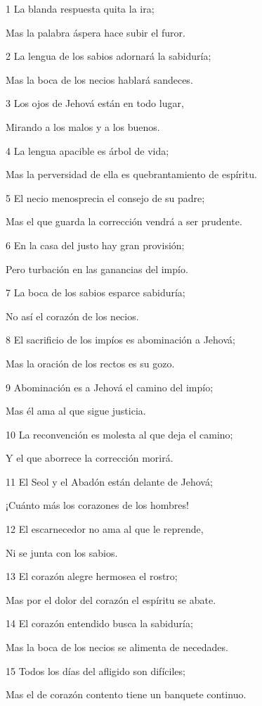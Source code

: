 \par 1 La blanda respuesta quita la ira;
\par Mas la palabra áspera hace subir el furor.
\par 2 La lengua de los sabios adornará la sabiduría;
\par Mas la boca de los necios hablará sandeces.
\par 3 Los ojos de Jehová están en todo lugar,
\par Mirando a los malos y a los buenos.
\par 4 La lengua apacible es árbol de vida;
\par Mas la perversidad de ella es quebrantamiento de espíritu.
\par 5 El necio menosprecia el consejo de su padre;
\par Mas el que guarda la corrección vendrá a ser prudente.
\par 6 En la casa del justo hay gran provisión;
\par Pero turbación en las ganancias del impío.
\par 7 La boca de los sabios esparce sabiduría;
\par No así el corazón de los necios.
\par 8 El sacrificio de los impíos es abominación a Jehová;
\par Mas la oración de los rectos es su gozo.
\par 9 Abominación es a Jehová el camino del impío;
\par Mas él ama al que sigue justicia.
\par 10 La reconvención es molesta al que deja el camino;
\par Y el que aborrece la corrección morirá.
\par 11 El Seol y el Abadón están delante de Jehová;
\par ¡Cuánto más los corazones de los hombres!
\par 12 El escarnecedor no ama al que le reprende,
\par Ni se junta con los sabios.
\par 13 El corazón alegre hermosea el rostro;
\par Mas por el dolor del corazón el espíritu se abate.
\par 14 El corazón entendido busca la sabiduría;
\par Mas la boca de los necios se alimenta de necedades.
\par 15 Todos los días del afligido son difíciles;
\par Mas el de corazón contento tiene un banquete continuo.
